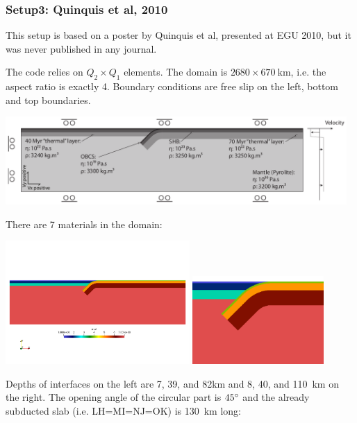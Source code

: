 \subsubsection*{Setup3: Quinquis et al, 2010}

This setup is based on a poster by Quinquis et al, presented at EGU 2010, but it
was never published in any journal.

The code relies on $Q_2\times Q_1$ elements. 
The domain is $2680\times 670~\si{\km}$, i.e. the aspect ratio is exactly 4.
Boundary conditions are free slip on the left, bottom and top boundaries. 

\begin{center}
\includegraphics[width=13cm]{python_codes/fieldstone_67/images/setup}
\end{center}

There are 7 materials in the domain:
\begin{center}
\includegraphics[width=7cm]{python_codes/fieldstone_67/images/mats}
\includegraphics[width=5cm]{python_codes/fieldstone_67/images/maats}
\end{center}

Depths of interfaces on the left are 7, 39, and 82\si{\km} and 
8, 40, and 110~\si{\km} on the right.
The opening angle of the circular part is $45\degree$ and the 
already subducted slab (i.e. LH=MI=NJ=OK) is 130~\si{\km} long:

